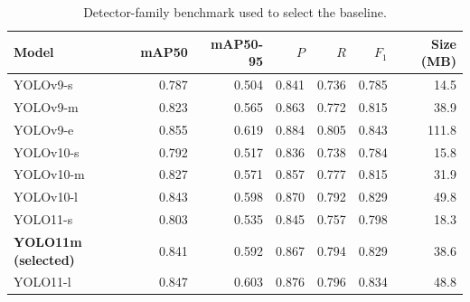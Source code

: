 \documentclass[12pt,a4paper,oneside]{report}
\begin{document}
\begin{table}[tbp]
  \centering
  \caption{Detector-family benchmark used to select the baseline.}
  \label{tab:appfamily}
  \setlength{\tabcolsep}{5pt}
  \begin{tabular}{@{}l r r r r r r@{}}
    \toprule
    Model & mAP50 & mAP50-95 & $P$ & $R$ & $F_1$ & Size (MB) \\
    \midrule
    YOLOv9-s   & 0.787 & 0.504 & 0.841 & 0.736 & 0.785 & 14.5 \\
    YOLOv9-m   & 0.823 & 0.565 & 0.863 & 0.772 & 0.815 & 38.9 \\
    YOLOv9-e   & 0.855 & 0.619 & 0.884 & 0.805 & 0.843 & 111.8 \\
    YOLOv10-s  & 0.792 & 0.517 & 0.836 & 0.738 & 0.784 & 15.8 \\
    YOLOv10-m  & 0.827 & 0.571 & 0.857 & 0.777 & 0.815 & 31.9 \\
    YOLOv10-l  & 0.843 & 0.598 & 0.870 & 0.792 & 0.829 & 49.8 \\
    YOLO11-s   & 0.803 & 0.535 & 0.845 & 0.757 & 0.798 & 18.3 \\
    \textbf{YOLO11m (selected)} & 0.841 & 0.592 & 0.867 & 0.794 & 0.829 & 38.6 \\
    YOLO11-l   & 0.847 & 0.603 & 0.876 & 0.796 & 0.834 & 48.8 \\
    \bottomrule
  \end{tabular}
\end{table}
\end{document}
